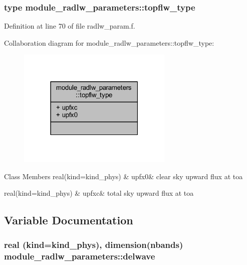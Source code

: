 \subsubsection{type module\+\_\+radlw\+\_\+parameters\+:\+:topflw\+\_\+type}


Definition at line 70 of file radlw\+\_\+param.\+f.



Collaboration diagram for module\+\_\+radlw\+\_\+parameters\+:\+:topflw\+\_\+type\+:\nopagebreak
\begin{figure}[H]
\begin{center}
\leavevmode
\includegraphics[width=210pt]{structmodule__radlw__parameters_1_1topflw__type__coll__graph}
\end{center}
\end{figure}
\begin{DoxyFields}{Class Members}
real(kind=kind\+\_\+phys)\hypertarget{namespacemodule__radlw__parameters_a7080fda1f732474077aeb302b57351cb}{}\label{namespacemodule__radlw__parameters_a7080fda1f732474077aeb302b57351cb}
&
upfx0&
clear sky upward flux at toa \\
\hline

real(kind=kind\+\_\+phys)\hypertarget{namespacemodule__radlw__parameters_a19ff2669a279a1db869766c0e3d88981}{}\label{namespacemodule__radlw__parameters_a19ff2669a279a1db869766c0e3d88981}
&
upfxc&
total sky upward flux at toa \\
\hline

\end{DoxyFields}


\subsection{Variable Documentation}
\subsubsection[{\texorpdfstring{delwave}{delwave}}]{\setlength{\rightskip}{0pt plus 5cm}real (kind=kind\+\_\+phys), dimension({\bf nbands}) module\+\_\+radlw\+\_\+parameters\+::delwave}\hypertarget{namespacemodule__radlw__parameters_a6ad1dff8ffc039d03c5cf3059344308e}{}\label{namespacemodule__radlw__parameters_a6ad1dff8ffc039d03c5cf3059344308e}


